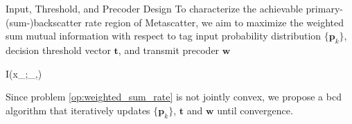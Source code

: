 \documentclass[journal]{IEEEtran}
\begin{document}
\begin{section}{Input, Threshold, and Precoder Design}
	To characterize the achievable primary-(sum-)backscatter rate region of Metascatter, we aim to maximize the weighted sum mutual information with respect to tag input probability distribution $\{\boldsymbol{p}_k\}$, decision threshold vector $\boldsymbol{t}$, and transmit precoder $\boldsymbol{w}$
	\begin{maxi!}
		{}{I(x_{};_{},)}{\label{op:weighted_sum_rate}}{\label{ob:weighted_sum_rate}}
	\end{maxi!}
	Since problem \eqref{op:weighted_sum_rate} is not jointly convex, we propose a \gls{bcd} algorithm that iteratively updates $\{\boldsymbol{p}_k\}$, $\boldsymbol{t}$ and $\boldsymbol{w}$ until convergence.


\end{section}
\end{document}
